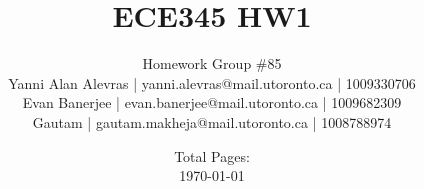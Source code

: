 \documentclass[11pt,fleqn]{article}
\theoremstyle{definition}
\theoremstyle{remark}
\begin{document}
\begin{titlepage}
\title{ECE345 HW1}
\author{ Homework Group \#85 \\
Yanni Alan Alevras | yanni.alevras@mail.utoronto.ca | 1009330706\\
Evan Banerjee | evan.banerjee@mail.utoronto.ca | 1009682309\\
Gautam | gautam.makheja@mail.utoronto.ca | 1008788974}
\date{
Total Pages: \pageref{LastPage}\\[2ex]
\today}
\maketitle

\setcounter{page}{0}
\thispagestyle{empty}
\end{titlepage}
\pagebreak \newpage

\clearpage
\newpage
\pagestyle{fancy}
\end{document}
